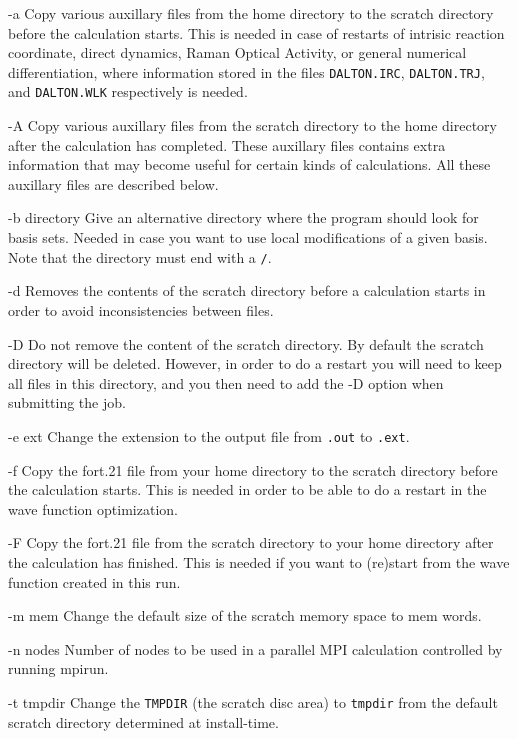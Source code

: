\begin{list}{--}{}
\item[-a] Copy various auxillary files from the
home directory to the 
scratch directory before the calculation starts. This is needed in
case of restarts of intrisic reaction coordinate, direct dynamics, 
Raman Optical Activity, or general numerical differentiation, where
information stored in the files \verb|DALTON.IRC|, \verb|DALTON.TRJ|,
and \verb|DALTON.WLK| respectively is needed. 
\item[-A] Copy various auxillary files from the scratch directory to the home
directory after the calculation has completed. These auxillary files
contains extra information that may become useful for certain kinds of
calculations. All these auxillary files are described below. 
\item[-b directory] Give an alternative directory where the program
should look for basis sets. Needed in case you want to use local
modifications of a given basis. Note that the directory must end with
a \verb|/|.
\item[-d] Removes the contents of the scratch directory before a
calculation starts in order to avoid inconsistencies between files.
\item[-D] Do not remove the content of the scratch directory. By
default the scratch directory will be deleted. However, in order to do
a restart you will need to keep all files in this directory, and you
then need to add the -D option when submitting the job.
\item[-e ext] Change the extension to the output file from \verb|.out|
to \verb|.ext|.
\item[-f] Copy the fort.21 file from your home directory to the scratch
directory before the calculation starts. This is needed in order to be
able to do a restart in the wave function optimization.
\item[-F] Copy the fort.21 file from the scratch
directory to your home 
directory after the calculation has finished. This is needed if you
want to (re)start from the wave function created in this run.
\item[-m mem] Change the default size of the scratch
memory space to
mem words.
\item[-n nodes] Number of nodes to be used in a parallel MPI calculation
controlled by running mpirun.
\item[-t tmpdir] Change the \verb|TMPDIR| (the scratch disc area) to
\verb|tmpdir| from the default scratch directory determined at
install-time.
\end{list}

